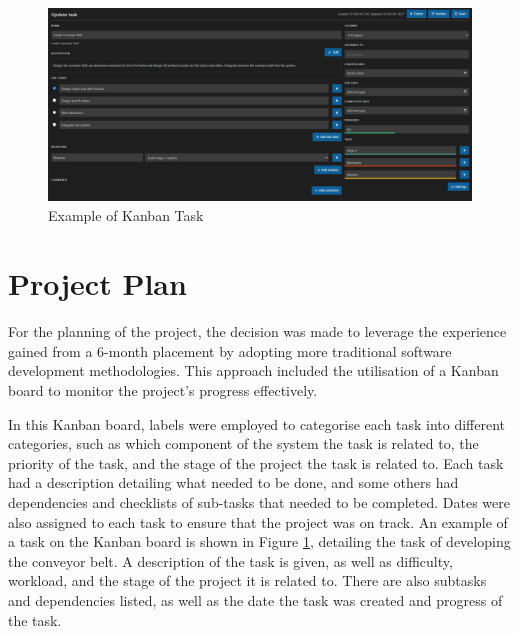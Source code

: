 \begin{figure}[t]
  \begin{minipage}[t]{\textwidth}
    \centering
    \includegraphics[width=\textwidth, height=\textheight, keepaspectratio]{imgs/appendix/taskexample.jpg}
    \caption{Example of Kanban Task}
    \label{fig:kantask}
  \end{minipage}
  \hfill 
\end{figure}

\section{Project Plan}
\label{sec:projectplan}
For the planning of the project, the decision was made to leverage the experience gained from a 6-month placement by adopting more traditional software development methodologies.
This approach included the utilisation of a Kanban board to monitor the project's progress effectively.

In this Kanban board, labels were employed to categorise each task into different categories, such as
which component of the system the task is related to, the priority of the task, and the stage of the project the task is related to.
Each task had a description detailing what needed to be done, and some others had dependencies and checklists of sub-tasks that needed to be completed.
Dates were also assigned to each task to ensure that the project was on track. An example of a task on the Kanban board is shown in Figure \ref*{fig:kantask},
detailing the task of developing the conveyor belt. A description of the task is given, as well as difficulty, workload, and the stage of the project it is related to.
There are also subtasks and dependencies listed, as well as the date the task was created and progress of the task.

